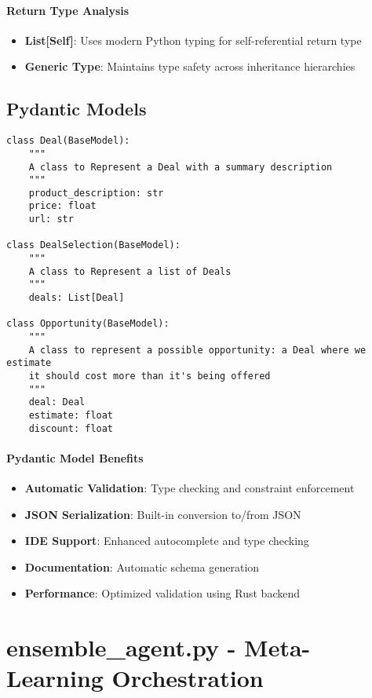 \vspace{1em}

\paragraph{Return Type Analysis}
\begin{itemize}
\item \textbf{List[Self]}: Uses modern Python typing for self-referential return type
\item \textbf{Generic Type}: Maintains type safety across inheritance hierarchies
\end{itemize}

\subsection{Pydantic Models}

\begin{lstlisting}[caption=Pydantic Model Definitions]
class Deal(BaseModel):
    """
    A class to Represent a Deal with a summary description
    """
    product_description: str
    price: float
    url: str

class DealSelection(BaseModel):
    """
    A class to Represent a list of Deals
    """
    deals: List[Deal]

class Opportunity(BaseModel):
    """
    A class to represent a possible opportunity: a Deal where we estimate
    it should cost more than it's being offered
    """
    deal: Deal
    estimate: float
    discount: float
\end{lstlisting}

\paragraph{Pydantic Model Benefits}
\begin{itemize}
\item \textbf{Automatic Validation}: Type checking and constraint enforcement
\item \textbf{JSON Serialization}: Built-in conversion to/from JSON
\item \textbf{IDE Support}: Enhanced autocomplete and type checking
\item \textbf{Documentation}: Automatic schema generation
\item \textbf{Performance}: Optimized validation using Rust backend
\end{itemize}

\section{ensemble\_agent.py - Meta-Learning Orchestration}

